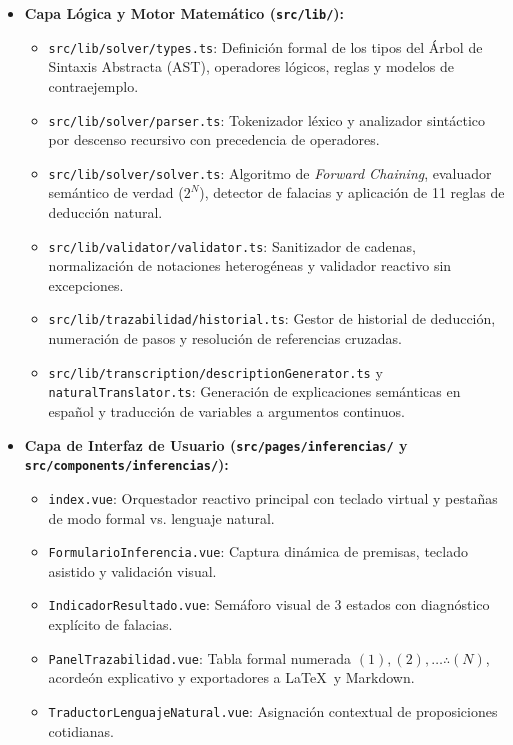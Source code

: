 \documentclass[11pt,a4paper]{article}
\begin{document}
\begin{itemize}[leftmargin=1.2cm]
    \item \textbf{Capa Lógica y Motor Matemático (\texttt{src/lib/}):}
    \begin{itemize}
        \item \texttt{src/lib/solver/types.ts}: Definición formal de los tipos del Árbol de Sintaxis Abstracta (AST), operadores lógicos, reglas y modelos de contraejemplo.
        \item \texttt{src/lib/solver/parser.ts}: Tokenizador léxico y analizador sintáctico por descenso recursivo con precedencia de operadores.
        \item \texttt{src/lib/solver/solver.ts}: Algoritmo de \textit{Forward Chaining}, evaluador semántico de verdad ($2^N$), detector de falacias y aplicación de 11 reglas de deducción natural.
        \item \texttt{src/lib/validator/validator.ts}: Sanitizador de cadenas, normalización de notaciones heterogéneas y validador reactivo sin excepciones.
        \item \texttt{src/lib/trazabilidad/historial.ts}: Gestor de historial de deducción, numeración de pasos y resolución de referencias cruzadas.
        \item \texttt{src/lib/transcription/descriptionGenerator.ts} y \texttt{naturalTranslator.ts}: Generación de explicaciones semánticas en español y traducción de variables a argumentos continuos.
    \end{itemize}
    \item \textbf{Capa de Interfaz de Usuario (\texttt{src/pages/inferencias/} y \texttt{src/components/inferencias/}):}
    \begin{itemize}
        \item \texttt{index.vue}: Orquestador reactivo principal con teclado virtual y pestañas de modo formal vs. lenguaje natural.
        \item \texttt{FormularioInferencia.vue}: Captura dinámica de premisas, teclado asistido y validación visual.
        \item \texttt{IndicadorResultado.vue}: Semáforo visual de 3 estados con diagnóstico explícito de falacias.
        \item \texttt{PanelTrazabilidad.vue}: Tabla formal numerada $(1), (2), \dots \therefore (N)$, acordeón explicativo y exportadores a \LaTeX\ y Markdown.
        \item \texttt{TraductorLenguajeNatural.vue}: Asignación contextual de proposiciones cotidianas.

\end{itemize}
\end{itemize}
\end{document}
